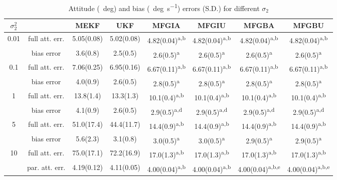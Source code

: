 \begin{table}
	\centering
	\caption{Attitude (\SI{}{deg}) and bias (\SI{}{deg\per\second}) errors (S.D.) for different $\sigma_2$}
	\label{tab:attEst-sim2-error}
	\footnotesize
	\addtolength{\tabcolsep}{-1.5pt}
	\begin{tabular}{c|c|cccccc}
		\toprule
		$\sigma_2^2$ & & MEKF & UKF & MFGIA & MFGIU & MFGBA & MFGBU \\ \midrule
		\multirow{2}{*}{0.01} & full att. err. & 5.05(0.08) & 5.02(0.08) & 4.82(0.04)\textsuperscript{a,b} & 4.82(0.04)\textsuperscript{a,b} & 4.82(0.04)\textsuperscript{a,b} & 4.82(0.04)\textsuperscript{a,b} \\
		& bias error & 3.6(0.8) & 2.5(0.5) & 2.6(0.5)\textsuperscript{a} & 2.6(0.5)\textsuperscript{a} & 2.6(0.5)\textsuperscript{a} & 2.6(0.5)\textsuperscript{a} \\ \hline
		\multirow{2}{*}{0.1} & full att. err. & 7.06(0.25) & 6.95(0.16) & 6.67(0.11)\textsuperscript{a,b} & 6.67(0.11)\textsuperscript{a,b} & 6.67(0.11)\textsuperscript{a,b} & 6.67(0.11)\textsuperscript{a,b} \\
		& bias error & 4.0(0.9) & 2.6(0.5) & 2.8(0.5)\textsuperscript{a} & 2.8(0.5)\textsuperscript{a} & 2.8(0.5)\textsuperscript{a} & 2.8(0.5)\textsuperscript{a} \\ \hline
		\multirow{2}{*}{1} & full att. err. & 13.8(1.4) & 13.3(1.3) & 10.1(0.4)\textsuperscript{a,b} & 10.1(0.4)\textsuperscript{a,b} & 10.1(0.4)\textsuperscript{a,b} & 10.1(0.4)\textsuperscript{a,b} \\
		& bias error & 4.1(0.9) & 2.6(0.5) & 2.9(0.5)\textsuperscript{a,d} & 2.9(0.5)\textsuperscript{a,d} & 2.9(0.5)\textsuperscript{a,d} & 2.9(0.5)\textsuperscript{a,d} \\ \hline
		\multirow{2}{*}{5} & full att. err. & 51.0(17.4) & 44.4(11.7) & 14.4(0.9)\textsuperscript{a,b} & 14.4(0.9)\textsuperscript{a,b} & 14.4(0.9)\textsuperscript{a,b} & 14.4(0.9)\textsuperscript{a,b} \\
		& bias error & 5.6(2.3) & 3.1(0.8) & 3.0(0.5)\textsuperscript{a} & 3.0(0.5)\textsuperscript{a} & 2.9(0.5)\textsuperscript{a} & 2.9(0.5)\textsuperscript{a} \\ \hline
		\multirow{3}{*}{10} & full att. err. & 75.0(17.1) & 72.2(16.9) & 17.0(1.3)\textsuperscript{a,b} & 17.0(1.3)\textsuperscript{a,b} & 17.0(1.3)\textsuperscript{a,b} & 17.0(1.3)\textsuperscript{a,b} \\
		& par. att. err. & 4.19(0.12) & 4.11(0.05) & 4.00(0.04)\textsuperscript{a,b} & 4.00(0.04)\textsuperscript{a,b} & 4.00(0.04)\textsuperscript{a,b,e} & 4.00(0.04)\textsuperscript{a,b,e} \\

\end{tabular}
\end{table}
